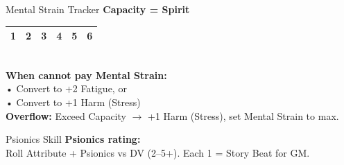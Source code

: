 \documentclass[10pt]{article}
\begin{document}
\begin{minipage}[t]{0.48\linewidth}
    \vspace{0.5em}
    
    \begin{charbox}{Mental Strain Tracker}
        \textbf{Capacity = Spirit} \underline{\hspace{1.5cm}}\\
        \begin{tabular}{|p{1cm}|p{1cm}|p{1cm}|p{1cm}|p{1cm}|p{1cm}|}
            \hline
            1 & 2 & 3 & 4 & 5 & 6 \\
            \hline
        \end{tabular}\\
        \textbf{When cannot pay Mental Strain:}\\
        • Convert to +2 Fatigue, or\\
        • Convert to +1 Harm (Stress)\\
        \textbf{Overflow:} Exceed Capacity $\rightarrow$ +1 Harm (Stress), set Mental Strain to max.
    \end{charbox}
    
    \vspace{0.5em}
    
    \begin{charbox}{Psionics Skill}
        \textbf{Psionics rating:} \underline{\hspace{1.5cm}}\\
        Roll Attribute + Psionics vs DV (2--5+). Each 1 = Story Beat for GM.
    \end{charbox}
\end{minipage}
\hfill
\end{document}
